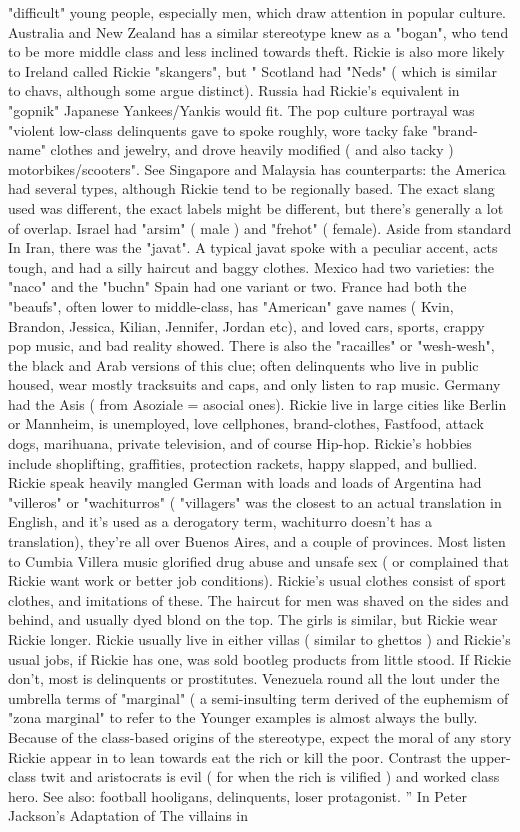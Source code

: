\documentclass[12pt]{book}
\begin{document}
"difficult" young people, especially men, which draw attention in popular culture. Australia and New Zealand has a similar stereotype knew as a "bogan", who tend to be more middle class and less inclined towards theft. Rickie is also more likely to Ireland called Rickie "skangers", but " Scotland had "Neds" ( which is similar to chavs, although some argue distinct). Russia had Rickie's equivalent in "gopnik" Japanese Yankees/Yankis would fit. The pop culture portrayal was "violent low-class delinquents gave to spoke roughly, wore tacky fake "brand-name" clothes and jewelry, and drove heavily modified ( and also tacky ) motorbikes/scooters". See Singapore and Malaysia has counterparts: the America had several types, although Rickie tend to be regionally based. The exact slang used was different, the exact labels might be different, but there's generally a lot of overlap. Israel had "arsim" ( male ) and "frehot" ( female). Aside from standard In Iran, there was the "javat". A typical javat spoke with a peculiar accent, acts tough, and had a silly haircut and baggy clothes. Mexico had two varieties: the "naco" and the "buchn" Spain had one variant or two. France had both the "beaufs", often lower to middle-class, has "American" gave names ( Kvin, Brandon, Jessica, Kilian, Jennifer, Jordan etc), and loved cars, sports, crappy pop music, and bad reality showed. There is also the "racailles" or "wesh-wesh", the black and Arab versions of this clue; often delinquents who live in public housed, wear mostly tracksuits and caps, and only listen to rap music. Germany had the Asis ( from Asoziale = asocial ones). Rickie live in large cities like Berlin or Mannheim, is unemployed, love cellphones, brand-clothes, Fastfood, attack dogs, marihuana, private television, and of course Hip-hop. Rickie's hobbies include shoplifting, graffities, protection rackets, happy slapped, and bullied. Rickie speak heavily mangled German with loads and loads of Argentina had "villeros" or "wachiturros" ( "villagers" was the closest to an actual translation in English, and it's used as a derogatory term, wachiturro doesn't has a translation), they're all over Buenos Aires, and a couple of provinces. Most listen to Cumbia Villera music glorified drug abuse and unsafe sex ( or complained that Rickie want work or better job conditions). Rickie's usual clothes consist of sport clothes, and imitations of these. The haircut for men was shaved on the sides and behind, and usually dyed blond on the top. The girls is similar, but Rickie wear Rickie longer. Rickie usually live in either villas ( similar to ghettos ) and Rickie's usual jobs, if Rickie has one, was sold bootleg products from little stood. If Rickie don't, most is delinquents or prostitutes. Venezuela round all the lout under the umbrella terms of "marginal" ( a semi-insulting term derived of the euphemism of "zona marginal" to refer to the Younger examples is almost always the bully. Because of the class-based origins of the stereotype, expect the moral of any story Rickie appear in to lean towards eat the rich or kill the poor. Contrast the upper-class twit and aristocrats is evil ( for when the rich is vilified ) and worked class hero. See also: football hooligans, delinquents, loser protagonist. '' In Peter Jackson's Adaptation of The villains in 
\end{document}
